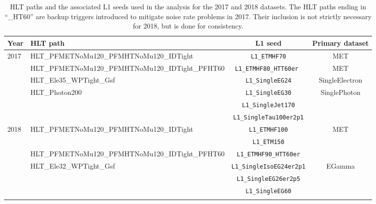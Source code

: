 \begin{table}[h]
    \centering
    \def\arraystretch{1.5}

    \small
    \caption{HLT paths and the associated L1 seeds used in the analysis for the 2017 and 2018 datasets. The HLT paths ending in ``\_HT60'' are backup triggers introduced  to mitigate noise rate problems in 2017. Their inclusion is not strictly necessary for 2018, but is done for consistency.}

    \footnotesize
    \begin{tabular}{l l c c}
        \hline\hline
        Year                   & HLT path                                                  & L1 seed                         & Primary dataset               \\\hline\hline
        \multirow{5}{*}{2017}  & HLT\_PFMETNoMu120\_PFMHTNoMu120\_IDTight                  & \texttt{L1\_ETMHF70}            & MET                           \\
                               & HLT\_PFMETNoMu120\_PFMHTNoMu120\_IDTight\_PFHT60          & \texttt{L1\_ETMHF80\_HTT60er }  & MET                           \\\cline{2-4}
                               & HLT\_Ele35\_WPTight\_Gsf                                  & \texttt{L1\_SingleEG24}         & SingleElectron                \\\cline{2-4}
                               & \multirow{3}{*}{HLT\_Photon200}                           & \texttt{L1\_SingleEG30}         & \multirow{3}{*}{SinglePhoton} \\
                               &                                                           & \texttt{L1\_SingleJet170}       &                               \\
                               &                                                           & \texttt{L1\_SingleTau100er2p1}  &                               \\\hline\hline

        \multirow{11}{*}{2018} & \multirow{2}{*}{HLT\_PFMETNoMu120\_PFMHTNoMu120\_IDTight} & \texttt{L1\_ETMHF100}           & \multirow{3}{*}{MET}          \\
                               &                                                           & \texttt{L1\_ETM150}             &                               \\
                               & HLT\_PFMETNoMu120\_PFMHTNoMu120\_IDTight\_PFHT60          & \texttt{L1\_ETMHF90\_HTT60er}   &                               \\\cline{2-4}
                               & \multirow{3}{*}{HLT\_Ele32\_WPTight\_Gsf}                 & \texttt{L1\_SingleIsoEG24er2p1} & \multirow{3}{*}{EGamma}       \\
                               &                                                           & \texttt{L1\_SingleEG26er2p5}    &                               \\
                               &                                                           & \texttt{L1\_SingleEG60}         &                               \\\cline{2-4}


\end{tabular}
\end{table}
